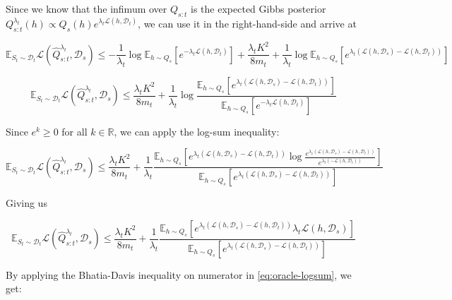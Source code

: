 \documentclass[letterpaper]{article}
\theoremstyle{definition}
\begin{document}
Since we know that the infimum over $Q_{s:t}$ is the expected Gibbs posterior $Q^{\lambda_t}_{s:t}(h)\propto Q_s(h)e^{\lambda_t\mathcal{L}(h,\mathcal{D}_t)}$, we can use it in the right-hand-side and arrive at

\begin{equation} \label{eq:opt-gibbs}
\mathbb{E}_{S_t\sim \mathcal{D}_t}\mathcal{L}( \hat{Q}^{\lambda_t}_{s:t},\mathcal{D}_s)\leq -\frac{1}{\lambda_t}\log \mathbb{E}_{h\sim Q_s}\left [e^{-\lambda_t\mathcal{L}(h,\mathcal{D}_t)}\right ]+\frac{\lambda_t K^2}{8m_t}+\frac{1}{\lambda_t}\log\mathbb{E}_{h\sim Q_s}\left [e^{\lambda_t(\mathcal{L}(h,\mathcal{D}_s)-\mathcal{L}(h,\mathcal{D}_t))} \right ]
\end{equation}

$$
\mathbb{E}_{S_t\sim \mathcal{D}_t}\mathcal{L}( \hat{Q}^{\lambda_t}_{s:t},\mathcal{D}_s)\leq \frac{\lambda_t K^2}{8m_t}+\frac{1}{\lambda_t}\log\frac{\mathbb{E}_{h\sim Q_s}\left [e^{\lambda_t(\mathcal{L}(h,\mathcal{D}_s)-\mathcal{L}(h,\mathcal{D}_t))} \right ]}{\mathbb{E}_{h\sim Q_s}\left [e^{-\lambda_t\mathcal{L}(h,\mathcal{D}_t)}\right ]}
$$

Since $e^k\geq 0$ for all $k\in \mathbb{R}$, we can apply the log-sum inequality:

$$
\mathbb{E}_{S_t\sim \mathcal{D}_t}\mathcal{L}( \hat{Q}^{\lambda_t}_{s:t},\mathcal{D}_s)\leq \frac{\lambda_t K^2}{8m_t}+\frac{1}{\lambda_t}\frac{\mathbb{E}_{h\sim Q_s}\left [e^{\lambda_t(\mathcal{L}(h,\mathcal{D}_s)-\mathcal{L}(h,\mathcal{D}_t))}\log\frac{e^{\lambda_t(\mathcal{L}(h,\mathcal{D}_s)-\mathcal{L}(h,\mathcal{D}_t))}}{e^{\lambda_t(-\mathcal{L}(h,\mathcal{D}_t))}} \right ]}{\mathbb{E}_{h\sim Q_s}\left [e^{\lambda_t(\mathcal{L}(h,\mathcal{D}_s)-\mathcal{L}(h,\mathcal{D}_t))}\right ]}
$$

Giving us 

\begin{equation} \label{eq:oracle-logsum}
\mathbb{E}_{S_t\sim \mathcal{D}_t}\mathcal{L}( \hat{Q}^{\lambda_t}_{s:t},\mathcal{D}_s)\leq \frac{\lambda_t K^2}{8m_t}+\frac{1}{\lambda_t}\frac{\mathbb{E}_{h\sim Q_s}\left [e^{\lambda_t(\mathcal{L}(h,\mathcal{D}_s)-\mathcal{L}(h,\mathcal{D}_t))}\lambda_t\mathcal{L}(h,\mathcal{D}_s) \right ]}{\mathbb{E}_{h\sim Q_s}\left [e^{\lambda_t(\mathcal{L}(h,\mathcal{D}_s)-\mathcal{L}(h,\mathcal{D}_t))}\right ]}
\end{equation}

By applying the Bhatia-Davis inequality on numerator in \eqref{eq:oracle-logsum}, we get:
\end{document}
